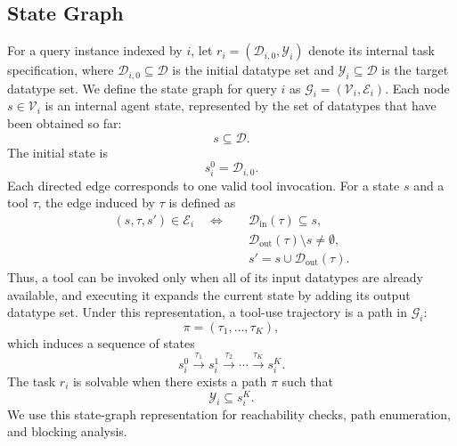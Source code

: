 \documentclass{llmxive}
\begin{document}


\subsection{State Graph}
\label{app:state-graph}

For a query instance indexed by $i$, let $r_i=(\mathcal{D}_{i,0}, \mathcal{Y}_i)$ denote its internal task specification, where $\mathcal{D}_{i,0}\subseteq\mathcal{D}$ is the initial datatype set and $\mathcal{Y}_i\subseteq\mathcal{D}$ is the target datatype set.
We define the state graph for query $i$ as $\mathcal{G}_i=(\mathcal{V}_i,\mathcal{E}_i)$.
Each node $s \in \mathcal{V}_i$ is an internal agent state, represented by the set of datatypes that have been obtained so far:
\begin{equation}
s \subseteq \mathcal{D}.
\end{equation}
The initial state is
\begin{equation}
s_i^0 = \mathcal{D}_{i,0}.
\end{equation}
Each directed edge corresponds to one valid tool invocation. 
For a state $s$ and a tool $\tau$, the edge induced by $\tau$ is defined as
\begin{equation}
\begin{aligned}
(s,\tau,s') \in \mathcal{E}_i
\quad \Longleftrightarrow \quad
& \mathcal{D}_{\mathrm{in}}(\tau) \subseteq s, \\
& \mathcal{D}_{\mathrm{out}}(\tau) \setminus s \neq \emptyset, \\
& s' = s \cup \mathcal{D}_{\mathrm{out}}(\tau).
\end{aligned}
\end{equation}
Thus, a tool can be invoked only when all of its input datatypes are already available, and executing it expands the current state by adding its output datatype set.
Under this representation, a tool-use trajectory is a path in $\mathcal{G}_i$:
\begin{equation}
\pi = (\tau_1,\ldots,\tau_K),
\end{equation}
which induces a sequence of states
\begin{equation}
s_i^0 \xrightarrow{\tau_1} s_i^1 \xrightarrow{\tau_2} \cdots \xrightarrow{\tau_K} s_i^K.
\end{equation}
The task $r_i$ is solvable when there exists a path $\pi$ such that
\begin{equation}
\mathcal{Y}_i \subseteq s_i^K.
\end{equation}
We use this state-graph representation for reachability checks, path enumeration, and blocking analysis.
\end{document}
